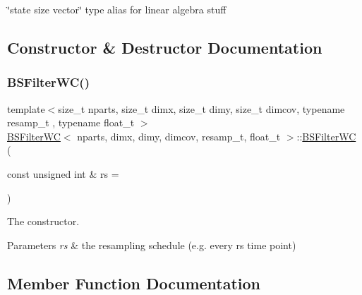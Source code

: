 \char`\"{}state size vector\char`\"{} type alias for linear algebra stuff 

\subsection{Constructor \& Destructor Documentation}
\mbox{\label{classBSFilterWC_a8b9399d0b7008aa6bca19a87834dfd6a}} 
\subsubsection{\texorpdfstring{B\+S\+Filter\+W\+C()}{BSFilterWC()}}
{\footnotesize\ttfamily template$<$size\+\_\+t nparts, size\+\_\+t dimx, size\+\_\+t dimy, size\+\_\+t dimcov, typename resamp\+\_\+t , typename float\+\_\+t $>$ \\
\hyperlink{classBSFilterWC}{B\+S\+Filter\+WC}$<$ nparts, dimx, dimy, dimcov, resamp\+\_\+t, float\+\_\+t $>$\+::\hyperlink{classBSFilterWC}{B\+S\+Filter\+WC} (\begin{DoxyParamCaption}\item[{const unsigned int \&}]{rs = {} }\end{DoxyParamCaption})}



The constructor. 


\begin{DoxyParams}{Parameters}
{\em rs} & the resampling schedule (e.\+g. every rs time point) \\
\hline
\end{DoxyParams}


\subsection{Member Function Documentation}
\mbox{\label{classBSFilterWC_a0637035a4553ae3ffeaf1ddce0de2c6b}} 
